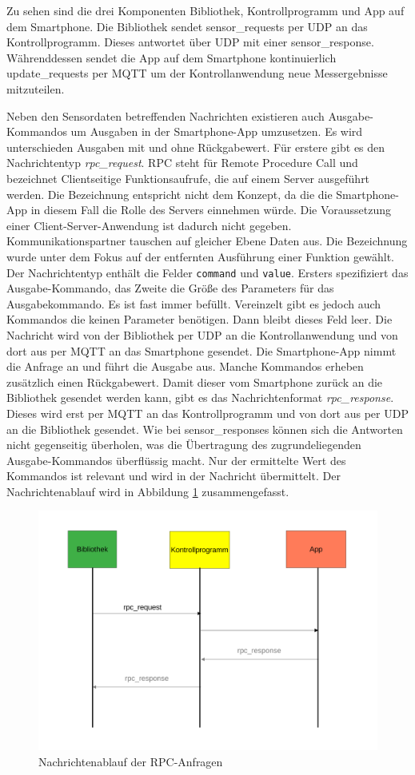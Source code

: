 \documentclass[11pt,a4paper]{report}
\begin{document}
Zu sehen sind die drei Komponenten Bibliothek, Kontrollprogramm und App auf dem Smartphone.
Die Bibliothek sendet sensor\_requests per UDP an das Kontrollprogramm.
Dieses antwortet über UDP mit einer sensor\_response.
Währenddessen sendet die App auf dem Smartphone kontinuierlich update\_requests per MQTT um der Kontrollanwendung neue Messergebnisse mitzuteilen.

Neben den Sensordaten betreffenden Nachrichten existieren auch Ausgabe-Kommandos um Ausgaben in der Smartphone-App umzusetzen.
Es wird unterschieden Ausgaben mit und ohne Rückgabewert.
Für erstere gibt es den Nachrichtentyp \textit{rpc\_request}.
RPC steht für Remote Procedure Call und bezeichnet Clientseitige Funktionsaufrufe, die auf einem Server ausgeführt werden.
Die Bezeichnung entspricht nicht dem Konzept, da die die Smartphone-App in diesem Fall die Rolle des Servers einnehmen würde.
Die Voraussetzung einer Client-Server-Anwendung ist dadurch nicht gegeben.
Kommunikationspartner tauschen auf gleicher Ebene Daten aus.
Die Bezeichnung wurde unter dem Fokus auf der entfernten Ausführung einer Funktion gewählt.
Der Nachrichtentyp enthält die Felder \texttt{command} und \texttt{value}.
Ersters spezifiziert das Ausgabe-Kommando, das Zweite die Größe des Parameters für das Ausgabekommando.
Es ist fast immer befüllt.
Vereinzelt gibt es jedoch auch Kommandos die keinen Parameter benötigen.
Dann bleibt dieses Feld leer.
Die Nachricht wird von der Bibliothek per UDP an die Kontrollanwendung und von dort aus per MQTT an das Smartphone gesendet.
Die Smartphone-App nimmt die Anfrage an und führt die Ausgabe aus.
Manche Kommandos erheben zusätzlich einen Rückgabewert.
Damit dieser vom Smartphone zurück an die Bibliothek gesendet werden kann, gibt es das Nachrichtenformat \textit{rpc\_response}.
Dieses wird erst per MQTT an das Kontrollprogramm und von dort aus per UDP an die Bibliothek gesendet.
Wie bei sensor\_responses können sich die Antworten nicht gegenseitig überholen, was die Übertragung des zugrundeliegenden Ausgabe-Kommandos überflüssig macht.
Nur der ermittelte Wert des Kommandos ist relevant und wird in der Nachricht übermittelt.
Der Nachrichtenablauf wird in Abbildung \ref{fig:message_flow_rpc} zusammengefasst.
\begin{figure}[htbp]
\centering
\includegraphics[width=.9\textwidth]{images/message_flow_rpc.pdf}
\caption{Nachrichtenablauf der RPC-Anfragen}
\label{fig:message_flow_rpc}
\end{figure}
\end{document}
